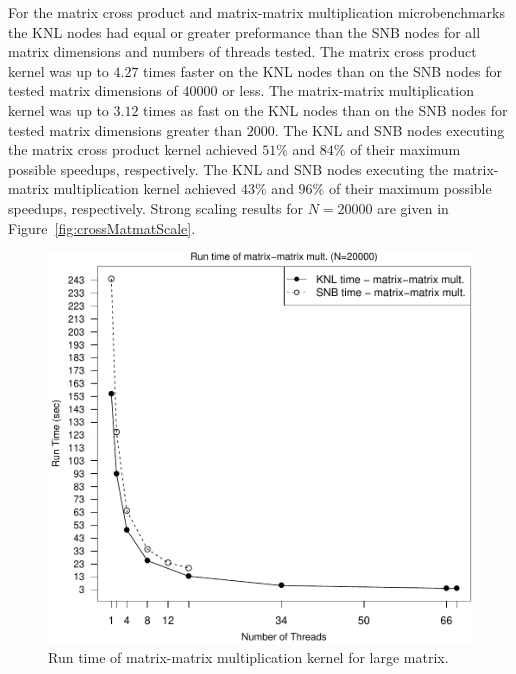 For the matrix cross product and matrix-matrix multiplication microbenchmarks the KNL
nodes had equal or greater preformance than the SNB nodes for all matrix dimensions and
numbers of threads tested. The matrix cross product kernel was up to $4.27$ times faster
on the KNL nodes than on the SNB nodes for tested matrix dimensions of $40000$ or less.
The matrix-matrix multiplication kernel was up to $3.12$ times as fast on the KNL nodes
than on the SNB nodes for tested matrix dimensions greater than $2000$. The KNL and SNB
nodes executing the matrix cross product kernel achieved $51\%$ and $84\%$ of their
maximum possible speedups, respectively. The KNL and SNB nodes executing the matrix-matrix
multiplication kernel achieved $43\%$ and $96\%$ of their maximum possible speedups,
respectively. Strong scaling results for $N=20000$ are given in
Figure~\ref{fig:crossMatmatScale}.


\begin{figure}
\includegraphics[height=\columnwidth, width=\columnwidth]{matmat_20000_68-rt.pdf}
\caption{Run time of matrix-matrix multiplication kernel for large matrix.}
\label{fig:largeMatmatTime}
\end{figure}

